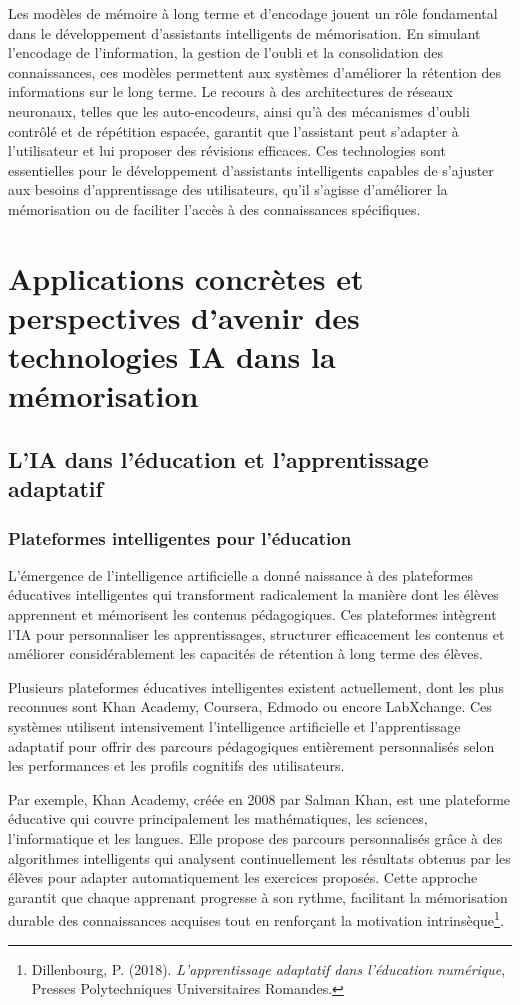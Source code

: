 \documentclass[11pt,a4paper]{report}
\begin{document}
Les modèles de mémoire à long terme et d’encodage jouent un rôle fondamental dans le développement d’assistants intelligents de mémorisation. En simulant l’encodage de l’information, la gestion de l’oubli et la consolidation des connaissances, ces modèles permettent aux systèmes d’améliorer la rétention des informations sur le long terme. Le recours à des architectures de réseaux neuronaux, telles que les auto-encodeurs, ainsi qu’à des mécanismes d’oubli contrôlé et de répétition espacée, garantit que l’assistant peut s’adapter à l’utilisateur et lui proposer des révisions efficaces. Ces technologies sont essentielles pour le développement d’assistants intelligents capables de s’ajuster aux besoins d’apprentissage des utilisateurs, qu’il s’agisse d’améliorer la mémorisation ou de faciliter l’accès à des connaissances spécifiques.

\chapter{Applications concrètes et perspectives d’avenir des technologies IA dans la mémorisation}

\section{L’IA dans l’éducation et l’apprentissage adaptatif}

\subsection{Plateformes intelligentes pour l’éducation}

L’émergence de l’intelligence artificielle a donné naissance à des plateformes éducatives intelligentes qui transforment radicalement la manière dont les élèves apprennent et mémorisent les contenus pédagogiques. Ces plateformes intègrent l’IA pour personnaliser les apprentissages, structurer efficacement les contenus et améliorer considérablement les capacités de rétention à long terme des élèves.

Plusieurs plateformes éducatives intelligentes existent actuellement, dont les plus reconnues sont Khan Academy, Coursera, Edmodo ou encore LabXchange. Ces systèmes utilisent intensivement l’intelligence artificielle et l’apprentissage adaptatif pour offrir des parcours pédagogiques entièrement personnalisés selon les performances et les profils cognitifs des utilisateurs.

Par exemple, Khan Academy, créée en 2008 par Salman Khan, est une plateforme éducative qui couvre principalement les mathématiques, les sciences, l’informatique et les langues. Elle propose des parcours personnalisés grâce à des algorithmes intelligents qui analysent continuellement les résultats obtenus par les élèves pour adapter automatiquement les exercices proposés. Cette approche garantit que chaque apprenant progresse à son rythme, facilitant la mémorisation durable des connaissances acquises tout en renforçant la motivation intrinsèque\footnote{Dillenbourg, P. (2018). \textit{L’apprentissage adaptatif dans l’éducation numérique}, Presses Polytechniques Universitaires Romandes.}.
\end{document}
